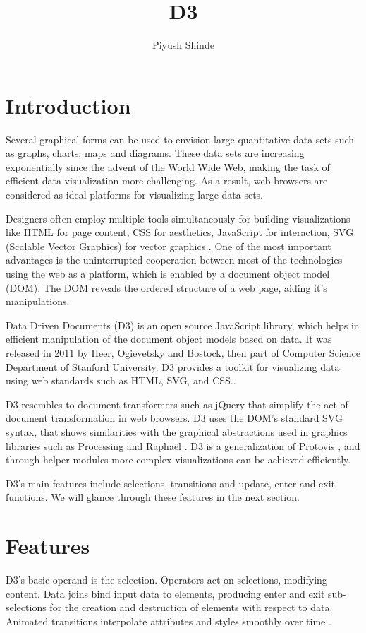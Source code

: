 \documentclass[9pt,twocolumn,twoside]{../../styles/osajnl}
\title{D3}
\author[1,*]{Piyush Shinde}
\affil[1]{School of Informatics and Computing, Bloomington, IN 47408, U.S.A.}
\affil[*]{Corresponding authors: piyushsshinde1992@gmail.com}
\begin{document}
\maketitle

\section{Introduction}

Several graphical forms can be used to envision large quantitative data sets such as graphs, charts, maps and diagrams. These data sets are increasing exponentially since the advent of the World Wide Web, making the task of efficient data visualization more challenging. As a result, web browsers are considered as ideal platforms for visualizing large data sets.

Designers often employ multiple tools simultaneously for building visualizations like HTML for page content, CSS for aesthetics, JavaScript for interaction, SVG (Scalable Vector Graphics) for vector graphics \cite{paper-d3}. One of the most important advantages is the uninterrupted cooperation between most of the technologies using the web as a platform, which is enabled by a document object model (DOM). The DOM reveals the ordered structure of a web page, aiding it's manipulations.  

Data Driven Documents (D3) is an open source JavaScript library, which helps in efficient manipulation of the document object models based on data. It was released in 2011 by Heer, Ogievetsky and Bostock, then part of Computer Science Department of Stanford University. D3 provides a toolkit for visualizing data using web standards such as HTML, SVG, and CSS.\cite{www-git}. 

D3 resembles to document transformers such as jQuery \cite{www-jquery} that simplify the act of document transformation in web browsers. D3 uses the DOM’s standard SVG syntax, that shows similarities with the graphical abstractions used in graphics libraries such as Processing and Raphaël \cite{www-raphael}. D3 is a generalization of Protovis \cite{www-protovis}, and through helper modules more complex visualizations can be  achieved efficiently. 

D3's main features include selections, transitions and update, enter and exit functions. We will glance through these features in the next section.

\section{Features}
D3’s basic operand is the selection. Operators act on selections, modifying content. Data joins bind input data to elements, producing enter and exit sub-selections for the creation and destruction of elements with respect to data. Animated transitions interpolate attributes and styles smoothly over time \cite{paper-d3}.
 
\end{document}

